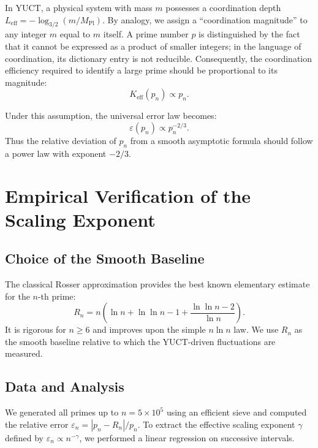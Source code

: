 \documentclass[12pt,a4paper]{article}
\theoremstyle{remark}
\begin{document}
	In YUCT, a physical system with mass \(m\) possesses a coordination depth \(L_{\mathrm{eff}} = -\log_{3/2}(m/M_{\mathrm{Pl}})\). By analogy, we assign a ``coordination magnitude'' to any integer \(m\) equal to \(m\) itself. A prime number \(p\) is distinguished by the fact that it cannot be expressed as a product of smaller integers; in the language of coordination, its dictionary entry is not reducible. Consequently, the coordination efficiency required to identify a large prime should be proportional to its magnitude:
	\[
	K_{\mathrm{eff}}(p_n) \propto p_n.
	\]
	
	Under this assumption, the universal error law becomes:
	\[
	\varepsilon(p_n) \propto p_n^{-2/3}.
	\]
	Thus the relative deviation of \(p_n\) from a smooth asymptotic formula should follow a power law with exponent \(-2/3\).
	
	\section{Empirical Verification of the Scaling Exponent}
	
	\subsection{Choice of the Smooth Baseline}
	
	The classical Rosser approximation provides the best known elementary estimate for the \(n\)-th prime:
	\[
	R_n = n\left(\ln n + \ln\ln n - 1 + \frac{\ln\ln n - 2}{\ln n}\right).
	\]
	It is rigorous for \(n \ge 6\) and improves upon the simple \(n\ln n\) law. We use \(R_n\) as the smooth baseline relative to which the YUCT-driven fluctuations are measured.
	
	\subsection{Data and Analysis}
	
	We generated all primes up to \(n = 5\times10^5\) using an efficient sieve and computed the relative error \(\varepsilon_n = |p_n - R_n|/p_n\). To extract the effective scaling exponent \(\gamma\) defined by \(\varepsilon_n \propto n^{-\gamma}\), we performed a linear regression on successive intervals.
	
\end{document}
